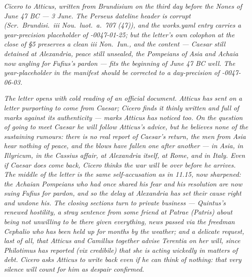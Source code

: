 
\textit{Cicero to Atticus, written from Brundisium on
the third day before the Nones of June 47 BC ---
3 June. The Perseus dateline header is corrupt
(\textit{Scr.\ Brundisi.\ iii Nou.\ luot.\ a.\ 707
(47)}), and the \textit{works.yaml} entry carries a
year-precision placeholder of \textit{-0047-01-25};
but the letter's own colophon at the close of \S5
preserves a clean \textit{iii Non.\ Iun.}, and the
content --- Caesar still detained at Alexandria,
peace still unsealed, the Pompeians of Asia and
Achaia now angling for Fufius's pardon --- fits the
beginning of June 47 BC well. The year-placeholder
in the manifest should be corrected to a day-precision
of -0047-06-03.}

\textit{The letter opens with cold reading of an
official document. Atticus has sent on a letter
purporting to come from Caesar; Cicero finds it
thinly written and full of marks against its
authenticity --- marks Atticus has noticed too. On
the question of going to meet Caesar he will follow
Atticus's advice, but he believes none of the
sustaining rumours: there is no real report of
Caesar's return, the men from Asia hear nothing of
peace, and the blows have fallen one after another
--- in Asia, in Illyricum, in the Cassius affair,
at Alexandria itself, at Rome, and in Italy. Even
if Caesar does come back, Cicero thinks the war
will be over before he arrives. The middle of the
letter is the same self-accusation as in 11.15,
now sharpened: the Achaian Pompeians who had once
shared his fear and his resolution are now suing
Fufius for pardon, and so the delay at Alexandria
has set their cause right and undone his. The
closing sections turn to private business ---
Quintus's renewed hostility, a stray sentence from
some friend at Patrae (\textit{Patris}) about
being not unwilling to be there given everything,
news passed via the freedman Cephalio who has
been held up for months by the weather; and a
delicate request, last of all, that Atticus and
Camillus together advise Terentia on her will,
since Philotimus has reported (\textit{vix
credibile}) that she is acting wickedly in matters
of debt. Cicero asks Atticus to write back even if
he can think of nothing: that very silence will
count for him as despair confirmed.}
